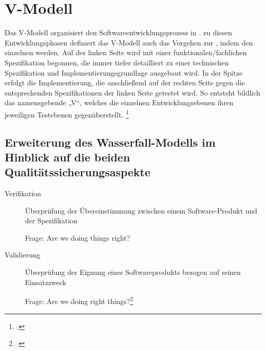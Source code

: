 \documentclass{lehramt-informatik}
\begin{document}
%

\section{V-Modell}

\begin{quellen}
\item \cite[Seite 49-52]{schatten}
\item \cite[Seite 27]{sosy:fs:1}
\item \cite[Kapitel 8.2.3 Plangetriebene Vorgehensmodelle, Seite 226-227]{schneider}
\item \cite{wiki:v-modell}
\end{quellen}

Das V-Modell organisiert  den
Softwareentwicklungsprozess in .  zu
diesen Entwicklungsphasen definiert das V-Modell auch das Vorgehen zur
, indem den einzelnen
 werden. Auf der
linken Seite wird mit einer funktionalen/fachlichen Spezifikation
begonnen, die immer tiefer detailliert zu einer technischen
Spezifikation und Implementierungsgrundlage ausgebaut wird. In der
Spitze erfolgt die Implementierung, die anschließend auf der rechten
Seite gegen die entsprechenden Spezifikationen der linken Seite getestet
wird. So entsteht bildlich das namensgebende „V“, welches die einzelnen
Entwicklungsebenen ihren jeweiligen Testebenen gegenüberstellt.
\footcite{wiki:v-modell}

\subsection{Erweiterung des Wasserfall-Modells im Hinblick auf die beiden
Qualitätssicherungsaspekte}

\begin{description}
\item[Verifikation]

Überprüfung der Übereinstimmung zwischen einem Software-Produkt und der
Spezifikation

Frage: Are we doing things right?

\item[Validierung]

Überprüfung der Eignung eines Softwareprodukts bezogen auf seinen
Einsatzzweck

Frage: Are we doing right things?\footcite[Seite 27]{sosy:fs:1}
\end{description}
\end{document}
